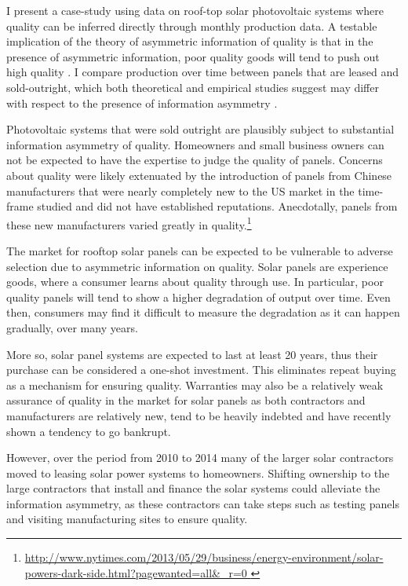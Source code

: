 \documentclass[12pt]{article}
\begin{document}
I present a case-study using data on roof-top solar photovoltaic systems where quality can be inferred directly through monthly production data. A testable implication of the theory of asymmetric information of quality is that in the presence of asymmetric information, poor quality goods will tend to push out high quality \citep{akerlof_market_1970, tirole_theory_1988}. I compare production over time between panels that are leased and sold-outright, which both theoretical and empirical studies suggest may differ with respect to the presence of information asymmetry \citep{johnson_leasing_2003,johnson_leasing_2010, johnson_role_2014,hendel_adverse_1997,gilligan_lemons_2004}. 

Photovoltaic systems that were sold outright are plausibly subject to substantial information asymmetry of quality. Homeowners and small business owners can not be expected to have the expertise to judge the quality of panels. Concerns about quality were likely extenuated by the introduction of panels from Chinese manufacturers that were nearly completely new to the US market in the time-frame studied and did not have established reputations. Anecdotally, panels from these new manufacturers varied greatly in quality.\footnote{\url{http://www.nytimes.com/2013/05/29/business/energy-environment/solar-powers-dark-side.html?pagewanted=all&_r=0
}}  

The market for rooftop solar panels can be expected to be vulnerable to adverse selection due to asymmetric information on quality. Solar panels are experience goods, where a consumer learns about quality through use. In particular, poor quality panels will tend to show a higher degradation of output over time. Even then, consumers may find it difficult to measure the degradation as it can happen gradually, over many years. 

More so, solar panel systems are expected to last at least 20 years, thus their purchase can be considered a one-shot investment. This eliminates repeat buying as a mechanism for ensuring quality. Warranties may also be a relatively weak assurance of quality in the market for solar panels as both contractors and manufacturers are relatively new, tend to be heavily indebted and have recently shown a tendency to go bankrupt. 

However, over the period from 2010 to 2014 many of the larger solar contractors moved to leasing solar power systems to homeowners. Shifting ownership to the large contractors that install and finance the solar systems could alleviate the information asymmetry, as these contractors can take steps such as testing panels and visiting manufacturing sites to ensure quality.
\end{document}
